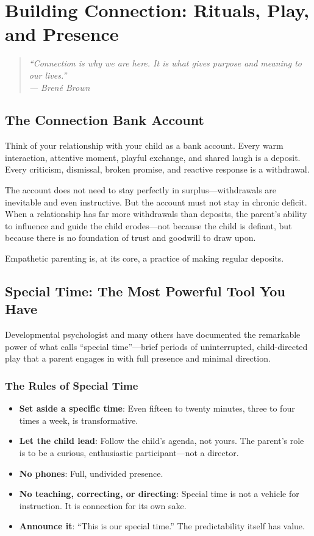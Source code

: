\chapter{Building Connection: Rituals, Play, and Presence}

\begin{quote}
\itshape ``Connection is why we are here. It is what gives purpose and
meaning to our lives.''\\
\upshape --- Bren\'e Brown
\end{quote}

\section{The Connection Bank Account}

Think of your relationship with your child as a bank account. Every
warm interaction, attentive moment, playful exchange, and shared laugh
is a deposit. Every criticism, dismissal, broken promise, and reactive
response is a withdrawal.

The account does not need to stay perfectly in surplus---withdrawals are
inevitable and even instructive. But the account must not stay in
chronic deficit. When a relationship has far more withdrawals than
deposits, the parent's ability to influence and guide the child
erodes---not because the child is defiant, but because there is no
foundation of trust and goodwill to draw upon.

Empathetic parenting is, at its core, a practice of making regular deposits.

\section{Special Time: The Most Powerful Tool You Have}

Developmental psychologist \citet{cohen2001} and many others have documented
the remarkable power of what \citeauthor{cohen2001} calls ``special time''---brief periods
of uninterrupted, child-directed play that a parent engages in with full
presence and minimal direction.

\subsection{The Rules of Special Time}

\begin{itemize}
  \item \textbf{Set aside a specific time}: Even fifteen to twenty minutes,
        three to four times a week, is transformative.
  \item \textbf{Let the child lead}: Follow the child's agenda, not yours.
        The parent's role is to be a curious, enthusiastic participant---not
        a director.
  \item \textbf{No phones}: Full, undivided presence.
  \item \textbf{No teaching, correcting, or directing}: Special time is not
        a vehicle for instruction. It is connection for its own sake.
  \item \textbf{Announce it}: ``This is our special time.'' The
        predictability itself has value.
\end{itemize}


